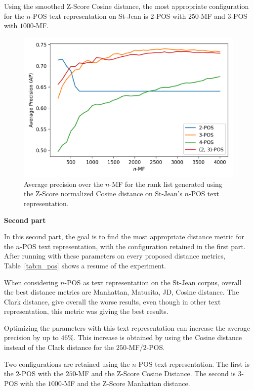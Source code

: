 Using the smoothed Z-Score Cosine distance, the most appropriate configuration for the $n$-POS text representation on St-Jean is $2$-POS with $250$-MF and $3$-POS with $1000$-MF.

\begin{figure}[!t]
  \centering
  \caption{Average precision over the $n$-MF for the rank list generated using the Z-Score normalized Cosine distance on St-Jean's $n$-POS text representation.}
  \label{fig:n_pos}
  \includegraphics[width=\linewidth]{img/n_pos.png}
\end{figure}

\textbf{Second part}

In this second part, the goal is to find the most appropriate distance metric for the $n$-POS text representation, with the configuration retained in the first part.
After running with these parameters on every proposed distance metrics, Table~\ref{tab:n_pos} shows a resume of the experiment.

When considering $n$-POS as text representation on the St-Jean corpus, overall the best distance metrics are Manhattan, Matusita, JD, Cosine distance.
The Clark distance, give overall the worse results, even though in other text representation, this metric was giving the best results.

Optimizing the parameters with this text representation can increase the average precision by up to $46$\%.
This increase is obtained by using the Cosine distance instead of the Clark distance for the $250$-MF/$2$-POS.

Two configurations are retained using the $n$-POS text representation.
The first is the $2$-POS with the $250$-MF and the Z-Score Cosine Distance.
The second is $3$-POS with the $1000$-MF and the Z-Score Manhattan distance.

